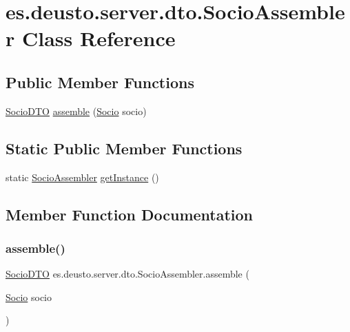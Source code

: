 \hypertarget{classes_1_1deusto_1_1server_1_1dto_1_1_socio_assembler}{}\section{es.\+deusto.\+server.\+dto.\+Socio\+Assembler Class Reference}
\label{classes_1_1deusto_1_1server_1_1dto_1_1_socio_assembler}
\subsection*{Public Member Functions}
\begin{DoxyCompactItemize}
\item 
\mbox{\hyperlink{classes_1_1deusto_1_1server_1_1dto_1_1_socio_d_t_o}{Socio\+D\+TO}} \mbox{\hyperlink{classes_1_1deusto_1_1server_1_1dto_1_1_socio_assembler_a8788f14abfb08165ad8478c3a7418571}{assemble}} (\mbox{\hyperlink{classes_1_1deusto_1_1client_1_1data_1_1_socio}{Socio}} socio)
\end{DoxyCompactItemize}
\subsection*{Static Public Member Functions}
\begin{DoxyCompactItemize}
\item 
static \mbox{\hyperlink{classes_1_1deusto_1_1server_1_1dto_1_1_socio_assembler}{Socio\+Assembler}} \mbox{\hyperlink{classes_1_1deusto_1_1server_1_1dto_1_1_socio_assembler_ab9648d889af755ac3398a9a319a729d6}{get\+Instance}} ()
\end{DoxyCompactItemize}


\subsection{Member Function Documentation}
\mbox{\label{classes_1_1deusto_1_1server_1_1dto_1_1_socio_assembler_a8788f14abfb08165ad8478c3a7418571}} 
\subsubsection{\texorpdfstring{assemble()}{assemble()}}
{\footnotesize\ttfamily \mbox{\hyperlink{classes_1_1deusto_1_1server_1_1dto_1_1_socio_d_t_o}{Socio\+D\+TO}} es.\+deusto.\+server.\+dto.\+Socio\+Assembler.\+assemble (\begin{DoxyParamCaption}\item[{\mbox{\hyperlink{classes_1_1deusto_1_1client_1_1data_1_1_socio}{Socio}}}]{socio }\end{DoxyParamCaption})}

